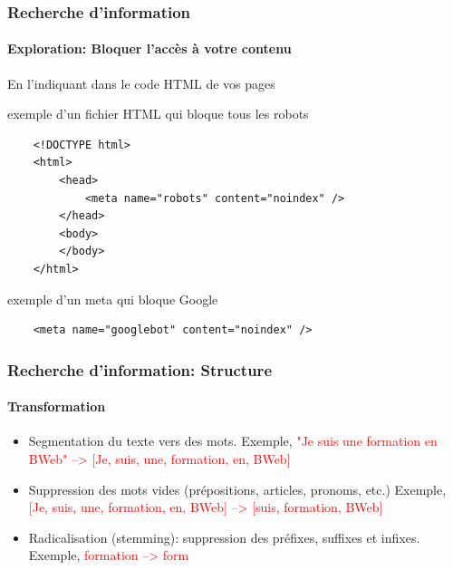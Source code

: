 \documentclass{beamer}
\begin{document}
\begin{frame}[fragile]
\frametitle{Recherche d'information}
\framesubtitle{Exploration: Bloquer l'accès à votre contenu}

En l'indiquant dans le code HTML de vos pages

\begin{exampleblock}{exemple d'un fichier HTML qui bloque tous les robots}
	\scriptsize\bfseries
	\begin{lstlisting}
	<!DOCTYPE html>
	<html>
	    <head>
	        <meta name="robots" content="noindex" />
	    </head>
	    <body>
	    </body>
	</html>
	\end{lstlisting}
\end{exampleblock}

\begin{exampleblock}{exemple d'un meta qui bloque Google}
	\scriptsize\bfseries
	\begin{lstlisting}
	<meta name="googlebot" content="noindex" />
	\end{lstlisting}
\end{exampleblock}

\end{frame}

\begin{frame}
\frametitle{Recherche d'information: Structure}
\framesubtitle{Transformation}

\begin{itemize}
	\item Segmentation du texte vers des mots. 
	Exemple, \textcolor{red}{"Je suis une formation en BWeb" --> [Je, suis, une, formation, en, BWeb]}
	
	\item Suppression des mots vides (prépositions, articles, pronoms, etc.)
	Exemple, \textcolor{red}{[Je, suis, une, formation, en, BWeb] --> [suis, formation, BWeb]}
	
	\item Radicalisation (stemming): suppression des préfixes, suffixes et infixes. 
	Exemple, \textcolor{red}{formation --> form}
\end{itemize}

\end{frame}
\end{document}
